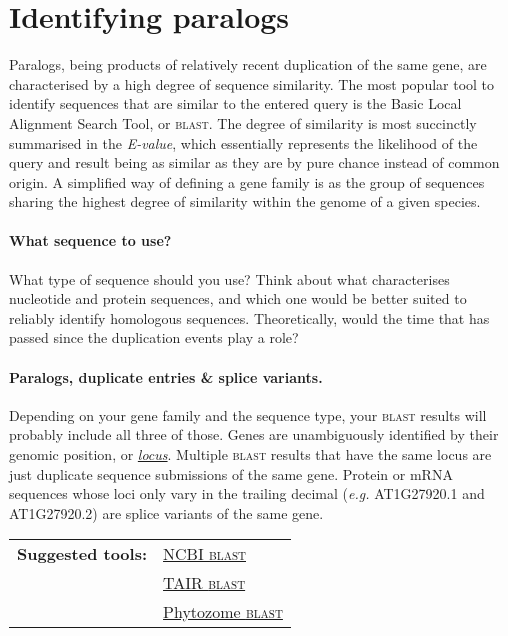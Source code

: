 \documentclass[11pt]{article}
\begin{document}
	\section{Identifying paralogs\label{sec:find}}
	
	Paralogs, being products of relatively recent duplication of the same gene, are characterised by a high degree of sequence similarity. 
	The most popular tool to identify sequences that are similar to the entered query is the Basic Local Alignment Search Tool, or \textsc{blast}. 
	The degree of similarity is most succinctly summarised in the \textit{E-value}, which essentially represents the likelihood of the query and result being as similar as they are by pure chance instead of common origin.
	A simplified way of defining a gene family is as the group of sequences sharing the highest degree of similarity within the genome of a given species.
	
	\paragraph*{What sequence to use?} 
	What type of sequence should you use? Think about what characterises nucleotide and protein sequences, and which one would be better suited to reliably identify homologous sequences. Theoretically, would the time that has passed since the duplication events play a role?
	
	\paragraph*{Paralogs, duplicate entries \& splice variants.} 
	Depending on your gene family and the sequence type, your \textsc{blast} results will probably include all three of those. 
	Genes are unambiguously identified by their genomic position, or \href{https://www.arabidopsis.org/portals/nomenclature/guidelines.jsp#locus}{\textit{locus}}.
	Multiple \textsc{blast} results that have the same locus are just duplicate sequence submissions of the same gene. Protein or mRNA sequences whose loci only vary in the trailing decimal (\textit{e.g.} AT1G27920.1 and AT1G27920.2) are splice variants of the same gene.
	
	\vspace*{\baselineskip}
	
		\noindent\begin{tabular}{@{}ll}
		\textbf{Suggested tools:}	& \href{https://blast.ncbi.nlm.nih.gov/Blast.cgi}{NCBI \textsc{blast}} \\ 
		&  \href{https://www.arabidopsis.org/Blast/}{TAIR \textsc{blast}} \\ 
		&  \href{https://phytozome.jgi.doe.gov/pz/portal.html#!search?show=BLAST}{Phytozome \textsc{blast}}\\ 
		\end{tabular} 
	
\end{document}
